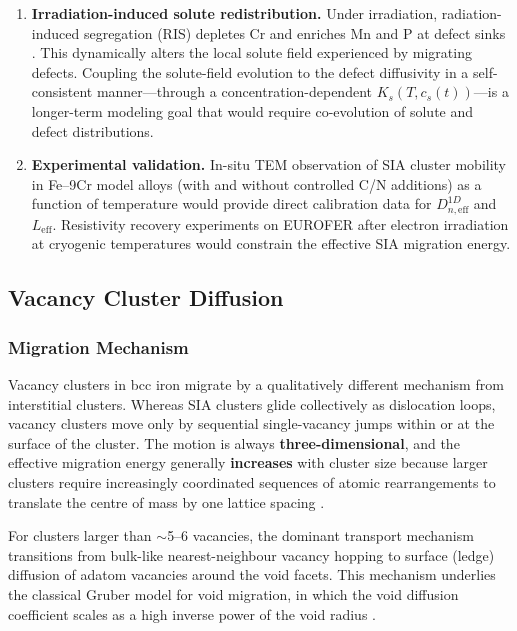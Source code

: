 \documentclass[pdflatex,sn-basic]{sn-jnl} %
\begin{document}
\begin{enumerate}
    \item \textbf{Irradiation-induced solute redistribution.}
    Under irradiation, radiation-induced segregation (RIS) depletes Cr and
    enriches Mn and P at defect sinks \citep{Messina2020}. This dynamically
    alters the local solute field experienced by migrating defects. Coupling
    the solute-field evolution to the defect diffusivity in a self-consistent
    manner---through a concentration-dependent $K_s(T,c_s(t))$---is a
    longer-term modeling goal that would require co-evolution of solute and
    defect distributions.

    \item \textbf{Experimental validation.}
    In-situ TEM observation of SIA cluster mobility in Fe--9Cr model alloys
    (with and without controlled C/N additions) as a function of temperature
    would provide direct calibration data for $D_{n,\mathrm{eff}}^{1D}$ and
    $L_{\mathrm{eff}}$. Resistivity recovery experiments on EUROFER after
    electron irradiation at cryogenic temperatures would constrain the
    effective SIA migration energy.
\end{enumerate}
\subsection{Vacancy Cluster Diffusion}
\label{sec:vac_cluster}

\subsubsection{Migration Mechanism}

Vacancy clusters in bcc iron migrate by a qualitatively different mechanism
from interstitial clusters. Whereas SIA clusters glide collectively as
dislocation loops, vacancy clusters move only by sequential single-vacancy
jumps within or at the surface of the cluster. The motion is always
\textbf{three-dimensional}, and the effective migration energy generally
\textbf{increases} with cluster size because larger clusters require
increasingly coordinated sequences of atomic rearrangements to translate the
centre of mass by one lattice spacing
\citep{Rahman2023,Fu2005_vac,Becquart2007_vac}.

For clusters larger than $\sim$5--6 vacancies, the dominant transport mechanism
transitions from bulk-like nearest-neighbour vacancy hopping to surface
(ledge) diffusion of adatom vacancies around the void facets. This mechanism
underlies the classical Gruber model for void migration, in which the void
diffusion coefficient scales as a high inverse power of the void radius
\citep{Gruber1967,Nichols1969}.
\end{document}
